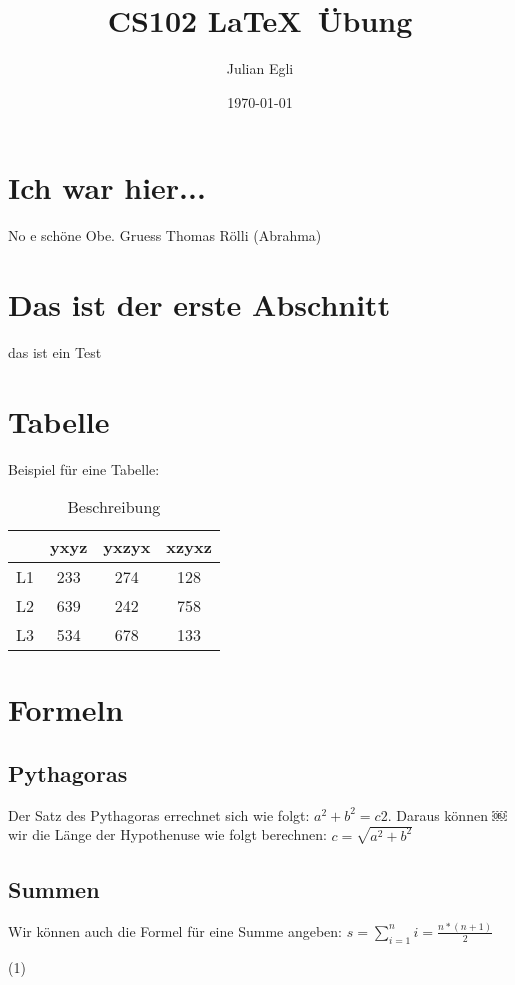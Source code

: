 \documentclass{article}
\date{\today}
\author{Julian Egli}
\title{CS102 \LaTeX  \ \"Ubung}
\begin{document}
\maketitle

\section{Ich war hier...}
No e sch\"one Obe. Gruess Thomas R\"olli (Abrahma)

\section{Das ist der erste Abschnitt}
das ist ein Test

\section{Tabelle}
Beispiel f\"ur eine Tabelle:
\begin{table}[h]
\centering
\begin{tabular}{c|c|c|c}
 & yxyz & yxzyx & xzyxz \\
\hline L1  & 233 & 274 & 128 \\
L2 & 639 & 242 & 758 \\
L3 & 534 & 678 & 133 \\
\end{tabular}
\caption{Beschreibung}
\end{table}

\section{Formeln}
\subsection{Pythagoras}
Der Satz des Pythagoras errechnet sich wie folgt: $a^2 + b^2 = c2$. Daraus k\"onnen
￼wir die L\"ange der Hypothenuse wie folgt berechnen: $c = \sqrt{a^2 + b^2}$
\subsection{Summen}
Wir k\"onnen auch die Formel f\"ur eine Summe angeben:
\newline
\center $s = \sum\limits_{i=1}^{n}i = \frac{n * (n + 1)}{2}$\begin{flushright} (1) \end{flushright}
\end{document}
